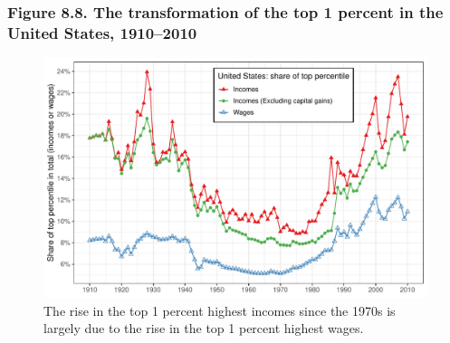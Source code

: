 \documentclass[t]{beamer}\usepackage[]{graphicx}\usepackage[]{color}
\newenvironment{knitrout}{}{} %
\begin{document}
\begin{frame}[label=Figure_8_8,fragile]
\frametitle{Figure 8.8. The transformation of the top 1 percent in the United States, 1910--2010}
\begin{figure}[t]
\begin{minipage}[b]{\textwidth}
\centering 
\begin{knitrout}\footnotesize
{}\color{fgcolor}

{\centering \includegraphics[width=1\linewidth]{figures/color/Figure_8_8} 

}



\end{knitrout}
\caption{The rise in the top 1 percent highest incomes since the 1970s is largely due to the rise in the top 1 percent highest wages.}
\end{minipage}
\end{figure}
\end{frame}
\end{document}
